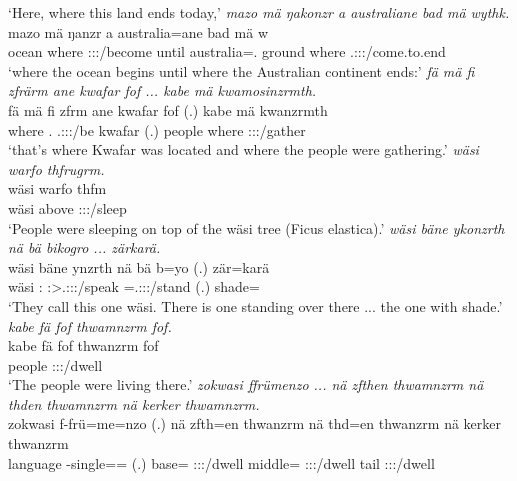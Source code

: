 \begin{exe}
	\trans `Here, where this land ends today,'
	\emph{mazo mä ŋakonzr a australiane bad mä wythk.}\\
	\gll mazo mä ŋanzr a australia=ane bad mä w\\ 
	ocean where \Stsg:\Sbj:\Nonpast:\Ipfv/become until australia=\Poss.{\Sg} ground where \Tsg.\F:\Sbj:\Nonpast:\Ipfv/come.to.end\\
	\trans `where the ocean begins until where the Australian continent ends:'
	\emph{fä mä fi zfrärm ane kwafar fof ... kabe mä kwamosinzrmth.}\\
	\gll fä mä fi zfrm ane kwafar fof (.) kabe mä kwanzrmth \\ 
	{\Dist} where \Third.{\Abs} \Tsg.\F:\Sbj:\Pst:\Dur/be {\Dem} kwafar {\Emph} (.) people where \Stpl:\Sbj:\Pst:\Dur/gather\\
	\trans `that's where Kwafar was located and where the people were gathering.'
	\emph{wäsi warfo thfrugrm.}\\
	\gll wäsi warfo thfm\\ 
	wäsi above \Stpl:\Sbj:\Pst:\Dur/sleep\\
	\trans `People were sleeping on top of the wäsi tree (Ficus elastica).'
	\emph{wäsi bäne ykonzrth nä bä bikogro ... zärkarä.}\\
	\gll wäsi bäne ynzrth nä bä b=yo (.) zär=karä\\ 
	wäsi \Dem:\Med{} \Stpl:\Sbj>\Tsg.\Masc:\Obj:\Nonpast:\Ipfv/speak {\Indf} \Med{} \Med=\Tsg.\Masc:\Nonpast:\Ipfv:\Andat/stand (.) shade={\Prop}\\
	\trans `They call this one wäsi. There is one standing over there ... the one with shade.'
	\emph{kabe fä fof thwamnzrm fof.}\\
	\gll kabe fä fof thwanzrm fof\\ 
	people {\Dist} {\Emph} \Stpl:\Sbj:\Pst:\Dur/dwell {\Emph}\\
	\trans `The people were living there.'
	\emph{zokwasi ffrümenzo ... nä zfthen thwamnzrm nä thden thwamnzrm nä kerker thwamnzrm.}\\
	\gll zokwasi f-frü=me=nzo (.) nä zfth=en thwanzrm nä thd=en thwanzrm nä kerker thwanzrm\\ 
	language \Redup-single=\Ins={\Only} (.) {\Indf} base={\Loc} \Stpl:\Sbj:\Pst:\Dur/dwell {\Indf} middle={\Loc} \Stpl:\Sbj:\Pst:\Dur/dwell {\Indf} tail \Stpl:\Sbj:\Pst:\Dur/dwell\\

\end{exe}

